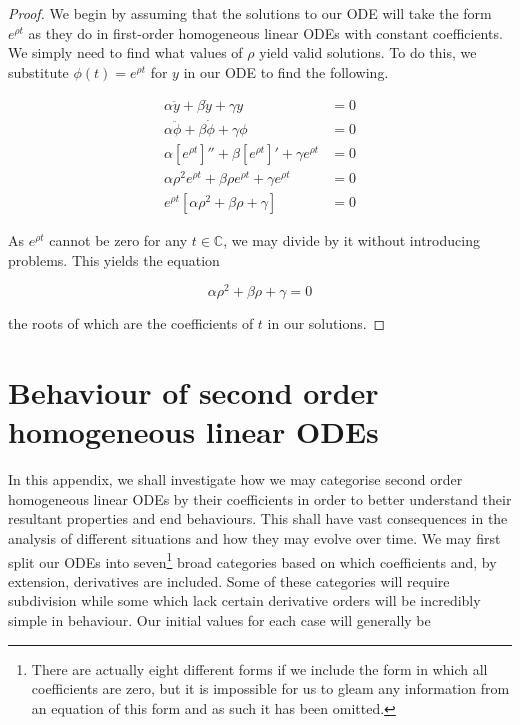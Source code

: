 \documentclass{article}
\begin{document}
\begin{proof}
	We begin by assuming that the solutions to our ODE will take the form $e^{\rho t}$ as they do in first-order homogeneous linear ODEs with constant coefficients. We simply need to find what values of $\rho$ yield valid solutions. To do this, we substitute $\phi(t) = e^{\rho t}$ for $y$ in our ODE to find the following.

	\begin{align*}
		\alpha\ddot{y} + \beta\dot{y} + \gamma y &= 0 \\
		\alpha\ddot{\phi} + \beta\dot{\phi} + \gamma \phi &= 0 \\
		\alpha[e^{\rho t}]'' + \beta[e^{\rho t}]' + \gamma e^{\rho t} &= 0 \\
		\alpha\rho^2 e^{\rho t} + \beta\rho e^{\rho t} + \gamma e^{\rho t} &= 0 \\
		e^{\rho t}[\alpha\rho^2 + \beta\rho + \gamma] &= 0
	\end{align*}

	As $e^{\rho t}$ cannot be zero for any $t \in \mathbb{C}$, we may divide by it without introducing problems. This yields the equation

	\begin{equation*}
		\alpha\rho^2 + \beta\rho + \gamma = 0
	\end{equation*}

	the roots of which are the coefficients of $t$ in our solutions.
\end{proof}

\section{Behaviour of second order homogeneous linear ODEs}

In this appendix, we shall investigate how we may categorise second order homogeneous linear ODEs by their coefficients in order to better understand their resultant properties and end behaviours. This shall have vast consequences in the analysis of different situations and how they may evolve over time. We may first split our ODEs into seven\footnote{\label{um... acshully}There are actually eight different forms if we include the form in which all coefficients are zero, but it is impossible for us to gleam any information from an equation of this form and as such it has been omitted.} broad categories based on which coefficients and, by extension, derivatives are included. Some of these categories will require subdivision while some which lack certain derivative orders will be incredibly simple in behaviour. Our initial values for each case will generally be
\end{document}

